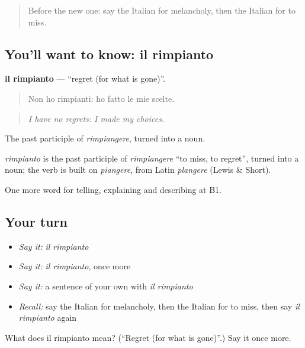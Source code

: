 \begin{quote}
Before the new one: say the Italian for melancholy, then the Italian for to miss.
\end{quote}

\subsection*{You'll want to know: il rimpianto}
\textbf{il rimpianto} — \textquotedblleft{}regret (for what is gone)\textquotedblright{}.

\begin{quote}
Non ho rimpianti: ho fatto le mie scelte.
\end{quote}

\begin{quote}
\emph{I have no regrets: I made my choices.}
\end{quote}

The past participle of \emph{rimpiangere}, turned into a noun.

\begin{cousinweb}
\emph{rimpianto} is the past participle of \emph{rimpiangere} \textquotedblleft{}to miss, to regret\textquotedblright{}, turned into a noun; the verb is built on \emph{piangere}, from Latin \emph{plangere} (Lewis \& Short).
\end{cousinweb}

\begin{grammarlens}[title={What you've built}]
One more word for telling, explaining and describing at B1.
\end{grammarlens}

\subsection*{Your turn}
\begin{itemize}
\raggedright
  \item \emph{Say it:} \emph{il rimpianto}
  \item \emph{Say it:} \emph{il rimpianto}, once more
  \item \emph{Say it:} a sentence of your own with \emph{il rimpianto}
  \item \emph{Recall:} say the Italian for melancholy, then the Italian for to miss, then say \emph{il rimpianto} again
\end{itemize}

\begin{tcolorbox}[breakable,colback=teal!4,colframe=teal!35!black,title={Before you move on}]
What does il rimpianto mean? (\textquotedblleft{}Regret (for what is gone)\textquotedblright{}.) Say it once more.
\end{tcolorbox}
